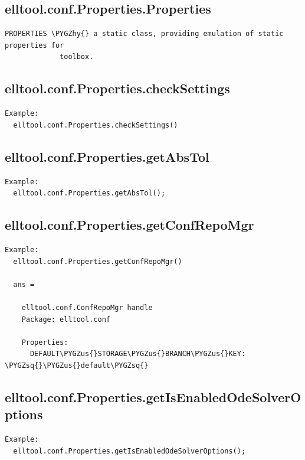 \documentclass[letterpaper,10pt,english]{sphinxmanual}
\def\PYGZus{\char`\_}
\def\PYGZhy{\char`\-}
\def\PYGZsq{\char`\'}
\begin{document}
\subsection{elltool.conf.Properties.Properties}
\label{chap_functions:elltool-conf-properties-properties}
\begin{Verbatim}[commandchars=\\\{\}]
PROPERTIES \PYGZhy{} a static class, providing emulation of static properties for
             toolbox.
\end{Verbatim}


\subsection{elltool.conf.Properties.checkSettings}
\label{chap_functions:elltool-conf-properties-checksettings}
\begin{Verbatim}[commandchars=\\\{\}]
Example:
  elltool.conf.Properties.checkSettings()
\end{Verbatim}


\subsection{elltool.conf.Properties.getAbsTol}
\label{chap_functions:elltool-conf-properties-getabstol}
\begin{Verbatim}[commandchars=\\\{\}]
Example:
  elltool.conf.Properties.getAbsTol();
\end{Verbatim}


\subsection{elltool.conf.Properties.getConfRepoMgr}
\label{chap_functions:elltool-conf-properties-getconfrepomgr}
\begin{Verbatim}[commandchars=\\\{\}]
Example:
  elltool.conf.Properties.getConfRepoMgr()

  ans =

    elltool.conf.ConfRepoMgr handle
    Package: elltool.conf

    Properties:
      DEFAULT\PYGZus{}STORAGE\PYGZus{}BRANCH\PYGZus{}KEY: \PYGZsq{}\PYGZus{}default\PYGZsq{}
\end{Verbatim}


\subsection{elltool.conf.Properties.getIsEnabledOdeSolverOptions}
\label{chap_functions:elltool-conf-properties-getisenabledodesolveroptions}
\begin{Verbatim}[commandchars=\\\{\}]
Example:
  elltool.conf.Properties.getIsEnabledOdeSolverOptions();
\end{Verbatim}
\end{document}
